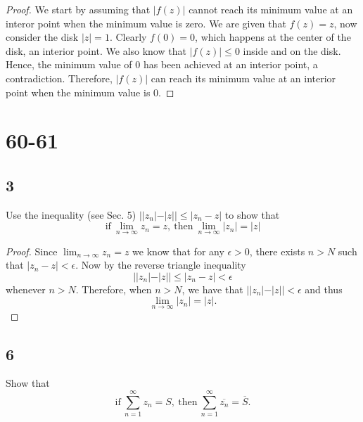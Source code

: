 \documentclass{article}
\begin{document}
\begin{proof}
    We start by assuming that $|f(z)|$ cannot reach its minimum value at an interor
    point when the minimum value is zero. We are given that $f(z) = z$, now consider
    the disk $|z| = 1$. Clearly $f(0) = 0$, which happens at the center of the disk,
    an interior point. We also know that $|f(z)| \leq 0$ inside and on the disk.
    Hence, the minimum value of $0$ has been achieved at an interior point,
    a contradiction. Therefore, $|f(z)|$ can reach its minimum value at an interior
    point when the minimum value is $0$.
\end{proof}

\section*{60-61}
\subsection*{3}
Use the inequality (see Sec. 5) $||z_n| - |z|| \leq |z_n - z|$ to show that
\begin{equation*}
    \text{if} \ \lim_{n\rightarrow\infty}z_n = z, \ \text{then} \
    \lim_{n\rightarrow\infty} |z_n| = |z|
\end{equation*}

\begin{proof}
    Since $\lim_{n\rightarrow\infty}z_n = z$ we know that for any $\epsilon > 0$,
    there exists $n > N$ such that $|z_n - z| < \epsilon$. Now by the reverse
    triangle inequality
    \begin{equation*}
        ||z_n| - |z|| \leq |z_n - z| < \epsilon
    \end{equation*}
    whenever $n > N$. Therefore, when $n > N$, we have that
    $||z_n| - |z|| < \epsilon$ and thus
    \begin{equation*}
        \lim_{n\rightarrow\infty} |z_n| = |z|.
    \end{equation*}
\end{proof}

\subsection*{6}
Show that
\begin{equation*}
    \text{if} \ \sum_{n=1}^\infty z_n = S, \ \text{then} \
    \sum_{n=1}^\infty \overline{z_n} = \overline{S}.
\end{equation*}
\end{document}
